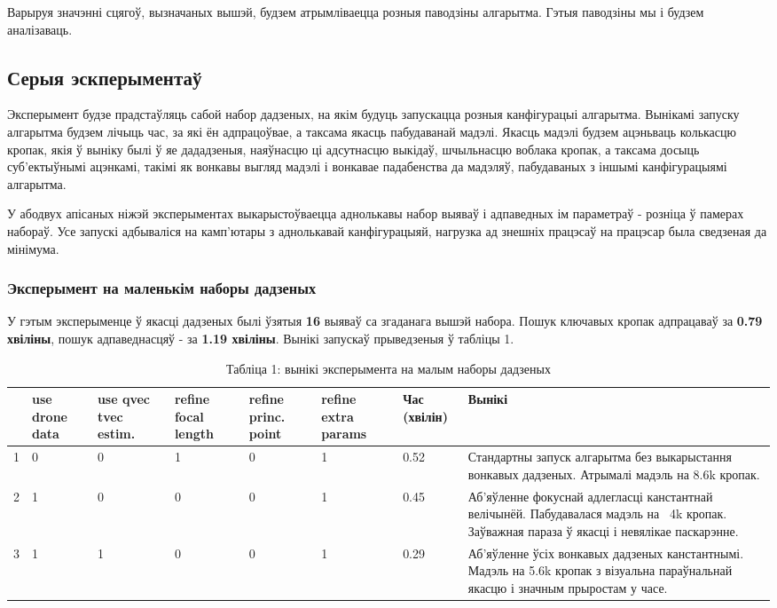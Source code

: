 Варыруя значэнні сцягоў, вызначаных вышэй, будзем атрымліваецца розныя паводзіны алгарытма. Гэтыя паводзіны мы і будзем аналізаваць.\par

\subsection*{Серыя эскперыментаў}
Эксперымент будзе прадстаўляць сабой набор дадзеных, на якім будуць запускацца розныя канфігурацыі алгарытма. Вынікамі запуску алгарытма будзем лічыць час, за які ён адпрацоўвае, а таксама якасць пабудаванай мадэлі. Якасць мадэлі будзем ацэньваць колькасцю кропак, якія ў выніку былі ў яе дададзеныя, наяўнасцю ці адсутнасцю выкідаў, шчыльнасцю воблака кропак, а таксама досыць суб'ектыўнымі ацэнкамі, такімі як вонкавы выгляд мадэлі і вонкавае падабенства да мадэляў, пабудаваных з іншымі канфігурацыямі алгарытма.\par
У абодвух апісаных ніжэй эксперыментах выкарыстоўваецца аднолькавы набор выяваў і адпаведных ім параметраў - розніца ў памерах набораў. Усе запускі адбываліся на камп'ютары з аднолькавай канфігурацыяй, нагрузка ад знешніх працэсаў на працэсар была сведзеная да мінімума.

\subsubsection*{Эксперымент на маленькім наборы дадзеных}
У гэтым эксперыменце ў якасці дадзеных былі ўзятыя {\bf 16} выяваў са згаданага вышэй набора. Пошук ключавых кропак адпрацаваў за {\bf 0.79 хвіліны}, пошук адпаведнасцяў - за {\bf 1.19 хвіліны}. Вынікі запускаў прыведзеныя ў табліцы 1.
\begin{table}[h!]
\centering
\begin{tabular}{ |m{1em}|m{2em}|m{2em}|m{2em}|m{2em}|m{2.5em}|m{3.2em}|m{12em}| }
 \hline
 & {\small use drone data} & {\small use qvec tvec estim. } & {\small refine focal length} & {\small refine princ. point} & {\small refine extra params} & Час (хвілін) & Вынікі \\
 \hline
 1 & 0 & 0 & 1 & 0 & 1 & 0.52 & Стандартны запуск алгарытма без выкарыстання вонкавых дадзеных. Атрымалі мадэль на 8.6k кропак. \\
 \hline
 2 & 1 & 0 & 0 & 0 & 1 & 0.45 & Аб'яўленне фокуснай адлегласці канстантнай велічынёй. Пабудавалася мадэль на ~4k кропак. Заўважная параза ў якасці і невялікае паскарэнне. \\ 
 \hline
 3 & 1 & 1 & 0 & 0 & 1 & 0.29 & Аб'яўленне ўсіх вонкавых дадзеных канстантнымі. Мадэль на 5.6k кропак з візуальна параўнальнай якасцю і значным прыростам у часе. \\ 
 \hline
\end{tabular}
\captionsetup{labelformat=empty}
\caption{Табліца 1: вынікі эксперымента на малым наборы дадзеных}
\end{table}

